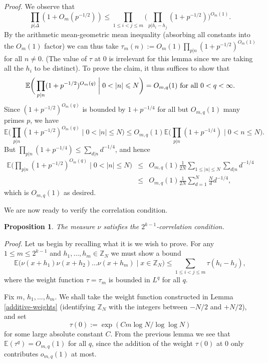 \documentclass[12pt,a4paper,reqno]{amsart}
\numberwithin{equation}{section}
\theoremstyle{plain}
\newtheorem{proposition}[subsection]{Proposition}
\theoremstyle{definition}
\renewcommand{\leq}{\leqslant}
\def\Z{{\mathbb Z}}
\def\E{{\mathbb E}}
\def\vs{\vspace{11pt}}
\def\ni{\noindent}
\def\proof{\noindent\textit{Proof. }}
\def\endproof{\hfill{\usebox{\proofbox}}}
\begin{document}
\proof We observe that
$$ \prod_{p|\Delta} (1 + O_m(p^{-1/2})) \leq \prod_{1 \leq i < j \leq m} \bigg(\prod_{p|h_i-h_j} (1 + p^{-1/2}) \bigg)^{O_m(1)}.$$
By the arithmetic mean-geometric mean inequality (absorbing all constants into the $O_m(1)$ factor) we can thus take 
$\tau_m(n) := O_m(1) \prod_{p | n} (1 + p^{-1/2})^{O_m(1)}$
for all $n \neq 0$.  (The value of $\tau$ at 0 is irrelevant for this lemma since we are taking all the $h_i$ to be distinct).
To prove the claim, it thus suffices to show that
$$ \E\bigg( \prod_{p|n} (1 + p^{-1/2})^{O_m(q)} \; \bigg| \; 0 < |n| \leq N \bigg) = O_{m,q}(1) \hbox{ for all } 0 < q < \infty.$$
Since $(1 + p^{-1/2})^{O_m(q)}$ is bounded
by $1 + p^{-1/4}$ for all but $O_{m,q}(1)$ many primes $p$, we have
$$ \E\bigg( \prod_{p|n} (1 + p^{-1/2})^{O_m(q)} \;  \bigg| \; 0 < |n| \leq N \bigg) \leq O_{m,q}(1) 
\E\bigg( \prod_{p|n} (1 + p^{-1/4}) \; \bigg| \; 0 < n \leq N \bigg).$$
But $\prod_{p|n} (1 + p^{-1/4}) \leq \sum_{d|n} d^{-1/4}$, and hence
\begin{eqnarray*} \E\bigg( \prod_{p|n} (1 + p^{-1/2})^{O_m(q)} \; \bigg| \; 0 < |n| \leq N \bigg) & \leq  & O_{m,q}(1)
\frac{1}{2N} \sum_{1 \leq |n| \leq N} \sum_{d|n} d^{-1/4} \\ &
\leq & O_{m,q}(1) \frac{1}{2N} \sum_{d=1}^N \frac{N}{d} d^{-1/4},\end{eqnarray*} which is $O_{m,q}(1)$ as desired.\endproof\vspace{11pt}

\ni We are now ready to verify the correlation condition.

\begin{proposition}\label{mu-cor-con} The measure $\nu$ satisfies the $2^{k-1}$-correlation condition.\end{proposition}
\proof Let us begin by recalling what it is we wish to prove. For any $1 \leq m \leq 2^{k-1}$ and
$h_1,\dots,h_m \in \mathbb{Z}_N$ we must show a bound
\begin{equation}\label{to-prove2} \E\big( \nu(x+h_1) \nu(x+h_2) \ldots \nu(x+h_m) \; \big| \; x \in \mathbb{Z}_N\big)
\leq \sum_{1 \leq i < j \leq m} \tau(h_i-h_j),\end{equation} where the weight function $\tau= \tau_m$ is bounded in $L^q$ for all $q$.\vs

\ni Fix $m$, $h_1, \ldots, h_m$.
We shall take the weight function constructed in Lemma \ref{additive-weights} (identifying $\Z_N$ with the integers between $-N/2$ and $+N/2$), 
and set \[ \tau(0) := \exp(Cm \log N/\log \log N)\]
for some large absolute constant $C$.  From the previous lemma we see that $\E(\tau^q) = O_{m,q}(1)$ for all $q$, since the
addition of the weight $\tau(0)$ at 0 only contributes $o_{m,q}(1)$ at most.\vs
\end{document}
